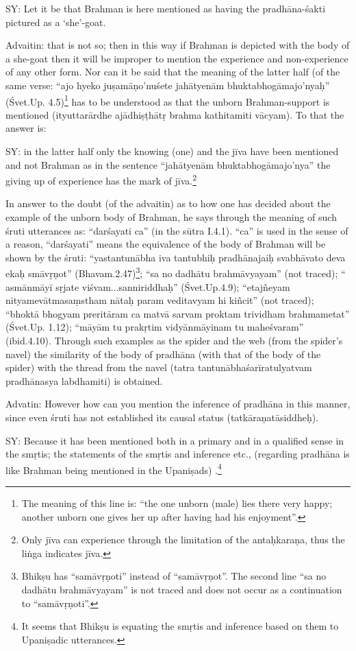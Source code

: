 SY: Let it be that Brahman is here mentioned as having the pradhāna-śakti  pictured as a ‘she’-goat.

Advaitin: that is not so; then in this way if Brahman is depicted with the body of a she-goat then it will be improper to mention the experience and non-experience of any other form.  Nor can it be said that the meaning of the latter half (of the same verse: “ajo hyeko juṣamāṇo’nuśete jahātyenām bhuktabhogāmajo’nyaḥ” (Śvet.Up. 4.5)\footnote{The meaning of this line is: “the one unborn (male) lies there very happy; another unborn one gives her up after  having had his enjoyment”.} has to be understood as that the unborn Brahman-support is mentioned (ityuttarārdhe ajādhiṣṭhātṛ brahma kathitamiti vācyam). To that the answer is:

SY: in the latter half only the knowing (one) and the jīva have been mentioned and not Brahman as in the sentence “jahātyenām bhuktabhogāmajo’nya” the giving up of experience has the mark of jīva.\footnote{Only jīva can experience through the limitation of the antaḥkaraṇa, thus the liṅga indicates jīva.}

In answer to the doubt (of the advaitin) as to how one has decided about the example of the unborn body of Brahman, he says through the meaning of such śruti utterances as:  “darśayati ca” (in the sūtra I.4.1). “ca” is used in the sense of a reason, “darśayati” means the equivalence of the body of Brahman will be shown by the śruti: “yastantunābha iva tantubhiḥ pradhānajaiḥ svabhāvato deva ekaḥ smāvṛṇot” (Bhavam.2.47)\footnote{Bhikṣu has “samāvṛṇoti” instead of “samāvṛṇot”. The second line “sa no dadhātu brahmāvyayam” is not traced and does not occur as a continuation to “samāvṛṇoti”.}; “sa no dadhātu brahmāvyayam” (not traced); “ asmānmāyī sṛjate viśvam...sanniriddhaḥ” (Śvet.Up.4.9); “etajñeyam nityamevātmasaṃstham nātaḥ param veditavyam hi kiñcit” (not traced); “bhoktā bhogyam preritāram ca matvā sarvam proktam trividham brahmametat” (Śvet.Up. 1.12); “māyām tu prakṛtim vidyānmāyinam tu maheśvaram” (ibid.4.10).  Through such examples as the spider and the web (from the spider’s navel) the similarity of the body of pradhāna (with that of the body of the spider) with the thread from the navel (tatra tantunābhaśarīratulyatvam pradhānasya labdhamiti) is obtained.

Advatin: However how can you mention the inference of pradhāna in this manner, since even śruti has not established its causal status (tatkāraṇatāsiddheḥ).

SY: Because it has been mentioned both in a primary and in a qualified sense in the smṛtis; the statements of the smṛtis and inference etc., (regarding pradhāna is like Brahman being mentioned in the Upaniṣads) .\footnote{It seems that Bhikṣu is equating the smṛtis and inference based on them to  Upaniṣadic utterances.}

